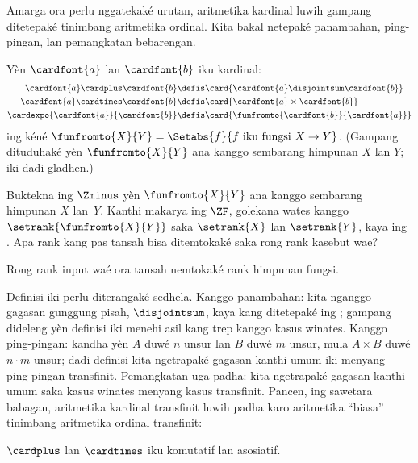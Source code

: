 \documentclass[../../../include/open-logic-section]{subfiles}
\begin{document}

Amarga ora perlu nggatekaké urutan, aritmetika kardinal luwih
gampang ditetepaké tinimbang aritmetika ordinal. Kita bakal
netepaké panambahan, ping-pingan, lan pemangkatan bebarengan.

\begin{defn}
Yèn $\cardfont{a}$ lan $\cardfont{b}$ iku kardinal:
\begin{align*}
	\cardfont{a} \cardplus \cardfont{b} &\defis
	\card{\cardfont{a} \disjointsum \cardfont{b}}\\
	\cardfont{a} \cardtimes \cardfont{b} &\defis
	\card{\cardfont{a} \times \cardfont{b}}\\
	\cardexpo{\cardfont{a}}{\cardfont{b}} &\defis
	\card{\funfromto{\cardfont{b}}{\cardfont{a}}}
\end{align*}
ing kéné $\funfromto{X}{Y} = \Setabs{f}{f \text{ iku fungsi } X \to Y}$.
(Gampang dituduhaké yèn $\funfromto{X}{Y}$ ana kanggo
sembarang himpunan $X$ lan $Y$; iki dadi gladhen.)
\end{defn}

\begin{prob}
Buktekna ing $\Zminus$ yèn $\funfromto{X}{Y}$ ana kanggo
sembarang himpunan $X$ lan~$Y$. Kanthi makarya ing $\ZF$,
golekana wates kanggo $\setrank{\funfromto{X}{Y}}$ saka
$\setrank{X}$ lan $\setrank{Y}$, kaya ing
. Apa rank
kang pas tansah bisa ditemtokaké saka rong rank kasebut wae?
\end{prob}
Rong rank input waé ora tansah nemtokaké rank himpunan fungsi.

Definisi iki perlu diterangaké sedhela. Kanggo panambahan:
kita nganggo gagasan gunggung pisah, $\disjointsum$,
kaya kang ditetepaké ing
; gampang dideleng
yèn definisi iki menehi asil kang trep kanggo kasus winates.
Kanggo ping-pingan:
 kandha yèn $A$
duwé $n$ unsur lan $B$ duwé $m$ unsur, mula $A \times B$
duwé $n \cdot m$ unsur; dadi definisi kita ngetrapaké gagasan kanthi umum
iki menyang ping-pingan transfinit. Pemangkatan uga padha:
kita ngetrapaké gagasan kanthi umum saka kasus winates menyang
kasus transfinit. Pancen, ing sawetara babagan,
aritmetika kardinal transfinit luwih padha karo aritmetika
“biasa” tinimbang aritmetika ordinal transfinit:

\begin{prop}
$\cardplus$ lan $\cardtimes$ iku komutatif lan asosiatif.
\end{prop}
\end{document}

